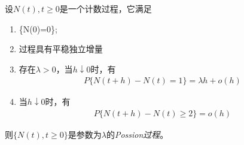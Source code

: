 设\(N(t),t\geqslant 0\)是一个计数过程，它满足
\begin{enumerate}
	\item \{N(0)=0\};
	\item 过程具有平稳独立增量
	\item 存在\(\lambda>0\)，当\(h\downarrow 0\)时，有
	      \begin{align*}
		      P\{N(t+h)-N(t)=1\}=\lambda h+o(h)
	      \end{align*}
	\item 当\(h\downarrow 0\)时，有
	      \begin{align*}
		      P\{N(t+h)-N(t)\geqslant 2\}=o(h)
	      \end{align*}
\end{enumerate}
则\(\{N(t),t\geqslant 0\}\)是参数为\(\lambda\)的\emph{Possion过程}。

